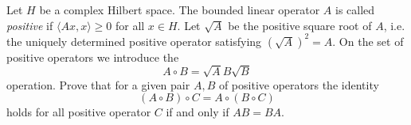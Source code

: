 Let $H$ be a complex Hilbert space. The bounded linear operator $A$ is called \textit{positive} if $\langle Ax, x\rangle \geq 0$ for all $x\in H$. Let $\sqrt A$ be the positive square root of $A$, i.e. the uniquely determined positive operator satisfying $(\sqrt{A})^2=A$. On the set of positive operators we introduce the
$$A\circ B=\sqrt A B\sqrt B$$operation. Prove that for a given pair $A, B$ of positive operators the identity
$$(A\circ B)\circ C=A\circ (B\circ C)$$holds for all positive operator $C$ if and only if $AB=BA$.